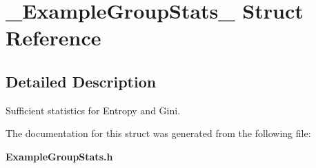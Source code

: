 \section{\_\-Example\-Group\-Stats\_\- Struct Reference}
\label{struct__ExampleGroupStats__}


\subsection{Detailed Description}
Sufficient statistics for Entropy and Gini. 



The documentation for this struct was generated from the following file:\begin{CompactItemize}
\item 
{\bf Example\-Group\-Stats.h}\end{CompactItemize}
